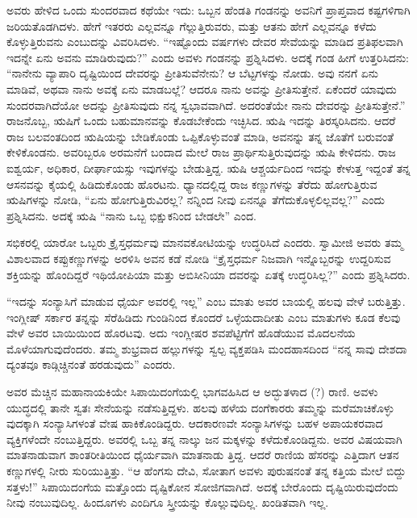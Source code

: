 ಅವರು ಹೇಳಿದ ಒಂದು ಸುಂದರವಾದ ಕಥೆಯೇ ಇದು: ಒಬ್ಬನ ಹೆಂಡತಿ ಗಂಡನನ್ನು ಅವನಿಗೆ ಪ್ರಾಪ್ತವಾದ ಕಷ್ಟಗಳಿಗಾಗಿ ಜರಿಯತೊಡಗಿದಳು. ಹೇಗೆ ಇತರರು ಎಲ್ಲವನ್ನೂ ಗೆಲ್ಲುತ್ತಿರುವರು, ಮತ್ತು ಆತನು ಹೇಗೆ ಎಲ್ಲವನ್ನೂ ಕಳೆದು ಕೊಳ್ಳುತ್ತಿರುವನು ಎಂಬುದನ್ನು ವಿವರಿಸಿದಳು. “ಇಷ್ಟೊಂದು ವರ್ಷಗಳು ದೇವರ ಸೇವೆಯನ್ನು ಮಾಡಿದ ಪ್ರತಿಫಲವಾಗಿ ಇದನ್ನೇ ಏನು ಅವನು ಮಾಡಿರುವುದು?” ಎಂದು ಅವಳು ಗಂಡನನ್ನು ಪ್ರಶ್ನಿಸಿದಳು. ಅದಕ್ಕೆ ಗಂಡ ಹೀಗೆ ಉತ್ತರಿಸಿದನು: “ನಾನೇನು ವ್ಯಾಪಾರಿ ದೃಷ್ಟಿಯಿಂದ ದೇವರನ್ನು ಪ್ರೀತಿಸುವೆನೇನು? ಆ ಬೆಟ್ಟಗಳನ್ನು ನೋಡು. ಅವು ನನಗೆ ಏನು ಮಾಡಿವೆ, ಅಥವಾ ನಾನು ಅವಕ್ಕೆ ಏನು ಮಾಡಬಲ್ಲೆ? ಆದರೂ ನಾನು ಅವನ್ನು ಪ್ರೀತಿಸುತ್ತೇನೆ. ಏಕೆಂದರೆ ಯಾವುದು ಸುಂದರವಾಗಿದೆಯೋ ಅದನ್ನು ಪ್ರೀತಿಸುವುದು ನನ್ನ ಸ್ವಭಾವವಾಗಿದೆ. ಅದರಂತೆಯೇ ನಾನು ದೇವರನ್ನು ಪ್ರೀತಿಸುತ್ತೇನೆ.” ರಾಜನೊಬ್ಬ, ಋಷಿಗೆ ಒಂದು ಬಹುಮಾನವನ್ನು ಕೊಡಬೇಕೆಂದು ಇಚ್ಛಿಸಿದ. ಋಷಿ ಇದನ್ನು ತಿರಸ್ಕರಿಸಿದನು. ಆದರೆ ರಾಜ ಬಲವಂತದಿಂದ ಋಷಿಯನ್ನು ಬೇಡಿಕೊಂಡು ಒಪ್ಪಿಕೊಳ್ಳುವಂತೆ ಮಾಡಿ, ಅವನನ್ನು ತನ್ನ ಜೊತೆಗೆ ಬರುವಂತೆ ಕೇಳಿಕೊಂಡನು. ಅವರಿಬ್ಬರೂ ಅರಮನೆಗೆ ಬಂದಾದ ಮೇಲೆ ರಾಜ ಪ್ರಾರ್ಥಿಸುತ್ತಿರುವುದನ್ನು ಋಷಿ ಕೇಳಿದನು. ರಾಜ ಐಶ್ವರ್ಯ, ಅಧಿಕಾರ, ದೀರ್ಘಾಯಸ್ಸು ಇವುಗಳನ್ನು ಬೇಡುತ್ತಿದ್ದ. ಋಷಿ ಆಶ್ಚರ್ಯದಿಂದ ಇದನ್ನು ಕೇಳುತ್ತ ಇದ್ದಂತೆ ತನ್ನ ಆಸನವನ್ನು ಕೈಯಲ್ಲಿ ಹಿಡಿದುಕೊಂಡು ಹೊರಟನು. ಧ್ಯಾನದಲ್ಲಿದ್ದ ರಾಜ ಕಣ್ಣುಗಳನ್ನು ತೆರೆದು ಹೋಗುತ್ತಿರುವ ಋಷಿಗಳನ್ನು ನೋಡಿ, “ಏನು ಹೋಗುತ್ತಿರುವಿರಲ್ಲ? ನನ್ನಿಂದ ನೀವು ಏನನ್ನೂ ತೆಗೆದುಕೊಳ್ಳಲಿಲ್ಲವಲ್ಲ?” ಎಂದು ಪ್ರಶ್ನಿಸಿದನು. ಅದಕ್ಕೆ ಋಷಿ “ನಾನು ಒಬ್ಬ ಭಿಕ್ಷುಕನಿಂದ ಬೇಡಲೇ” ಎಂದ.

ಸಭಿಕರಲ್ಲಿ ಯಾರೋ ಒಬ್ಬರು ಕ್ರೈಸ್ತಧರ್ಮವು ಮಾನವಕೋಟಿಯನ್ನು ಉದ್ಧರಿಸಿದೆ ಎಂದರು. ಸ್ವಾಮೀಜಿ ಅವರು ತಮ್ಮ ವಿಶಾಲವಾದ ಕಪ್ಪುಕಣ್ಣುಗಳನ್ನು ಅರಳಿಸಿ ಅವನ ಕಡೆ ನೋಡಿ “ಕ್ರೈಸ್ತಧರ್ಮ ನಿಜವಾಗಿ ಇನ್ನೊಬ್ಬರನ್ನು ಉದ್ದರಿಸುವ ಶಕ್ತಿಯನ್ನು ಹೊಂದಿದ್ದರೆ ಇಥಿಯೋಪಿಯಾ ಮತ್ತು ಅಬಿಸೀನಿಯಾ ದವರನ್ನು ಏತಕ್ಕೆ ಉದ್ಧರಿಸಿಲ್ಲ?” ಎಂದು ಪ್ರಶ್ನಿಸಿದರು.

“ಇದನ್ನು ಸಂನ್ಯಾಸಿಗೆ ಮಾಡುವ ಧೈರ್ಯ ಅವರಲ್ಲಿ ಇಲ್ಲ” ಎಂಬ ಮಾತು ಅವರ ಬಾಯಲ್ಲಿ ಹಲವು ವೇಳೆ ಬರುತ್ತಿತ್ತು. ಇಂಗ್ಲೀಷ್​ ಸರ್ಕಾರ ತನ್ನನ್ನು ಸೆರೆಹಿಡಿದು ಗುಂಡಿನಿಂದ ಕೊಂದರೆ ಒಳ್ಳೆಯದಾದೀತು ಎಂಬ ಮಾತುಗಳು ಕೂಡ ಕೆಲವು ವೇಳೆ ಅವರ ಬಾಯಿಯಿಂದ ಹೊರಟವು. ಅದು ಇಂಗ್ಲೀಷರ ಶವಪೆಟ್ಟಿಗೆಗೆ ಹೊಡೆಯುವ ಮೊದಲನೆಯ ಮೊಳೆಯಾಗುವುದೆಂದರು. ತಮ್ಮ ಶುಭ್ರವಾದ ಹಲ್ಲುಗಳನ್ನು ಸ್ವಲ್ಪ ವ್ಯಕ್ತಪಡಿಸಿ ಮಂದಹಾಸದಿಂದ “ನನ್ನ ಸಾವು ದೇಶದಾ ದ್ಯಂತವೂ ಕಾಡ್ಗಿಚ್ಚಿನಂತೆ ಹರಡುವುದು” ಎಂದರು.

ಅವರ ಮೆಚ್ಚಿನ ಮಹಾನಾಯಕಿಯೇ ಸಿಪಾಯಿದಂಗೆಯಲ್ಲಿ ಭಾಗವಹಿಸಿದ ಆ ಅದ್ಭುತಳಾದ (?) ರಾಣಿ. ಅವಳು ಯುದ್ಧದಲ್ಲಿ ತಾನೇ ಸ್ವತಃ ಸೇನೆಯನ್ನು ನಡೆಸುತ್ತಿದ್ದಳು. ಹಲವು ಹಳೆಯ ದಂಗೆಕಾರರು ತಮ್ಮನ್ನು ಮರೆಮಾಚಿಕೊಳ್ಳು ವುದಕ್ಕಾಗಿ ಸಂನ್ಯಾಸಿಗಳಂತೆ ವೇಷ ಹಾಕಿಕೊಂಡಿದ್ದರು. ಆದಕಾರಣವೇ ಸಂನ್ಯಾಸಿಗಳನ್ನು ಬಹಳ ಅಪಾಯಕರವಾದ ವ್ಯಕ್ತಿಗಳೆಂದೇ ನಂಬುತ್ತಿದ್ದರು. ಅವರಲ್ಲಿ ಒಬ್ಬ ತನ್ನ ನಾಲ್ಕು ಜನ ಮಕ್ಕಳನ್ನು ಕಳೆದುಕೊಂಡಿದ್ದನು. ಅವರ ವಿಷಯವಾಗಿ ಮಾತನಾಡುವಾಗ ಶಾಂತರೀತಿಯಿಂದ ಧೈರ್ಯವಾಗಿ ಮಾತನಾಡು ತ್ತಿದ್ದ. ಆದರೆ ರಾಣಿಯ ಹೆಸರನ್ನು ಎತ್ತಿದಾಗ ಆತನ ಕಣ್ಣುಗಳಲ್ಲಿ ನೀರು ಸುರಿಯುತ್ತಿತ್ತು. “ಆ ಹೆಂಗಸು ದೇವಿ, ಸೋತಾಗ ಅವಳು ಪುರುಷನಂತೆ ತನ್ನ ಕತ್ತಿಯ ಮೇಲೆ ಬಿದ್ದು ಸತ್ತಳು!” ಸಿಪಾಯಿದಂಗೆಯ ಮತ್ತೊಂದು ದೃಷ್ಟಿಕೋನ ಸೋಜಿಗವಾಗಿದೆ. ಅದಕ್ಕೆ ಬೇರೊಂದು ದೃಷ್ಟಿಯಿರುವುದೆಂದು ನೀವು ನಂಬುವುದಿಲ್ಲ. ಹಿಂದೂಗಳು ಎಂದಿಗೂ ಸ್ತ್ರೀಯನ್ನು ಕೊಲ್ಲುವುದಿಲ್ಲ. ಖಂಡಿತವಾಗಿ ಇಲ್ಲ.

